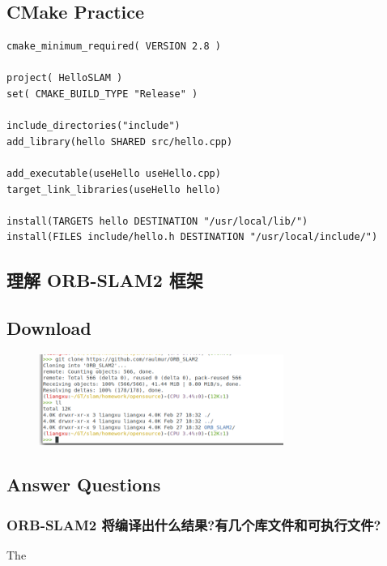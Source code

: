 \documentclass{article}
\begin{document}
\begin{CJK*}{UTF8}{gbsn}
\section{CMake Practice}
\begin{lstlisting}
cmake_minimum_required( VERSION 2.8 )

project( HelloSLAM )
set( CMAKE_BUILD_TYPE "Release" )

include_directories("include")
add_library(hello SHARED src/hello.cpp)

add_executable(useHello useHello.cpp)
target_link_libraries(useHello hello)

install(TARGETS hello DESTINATION "/usr/local/lib/")
install(FILES include/hello.h DESTINATION "/usr/local/include/")
\end{lstlisting}


\subsection{理解 ORB-SLAM2 框架}
\subsection{Download}

\begin{figure}[h]
	\includegraphics[width=8cm]{download_verf.png}
	\centering
\end{figure}

\subsection{Answer Questions}
\subsubsection{ORB-SLAM2 将编译出什么结果?有几个库文件和可执行文件?}
The 
\clearpage\end{CJK*}
\end{document}
